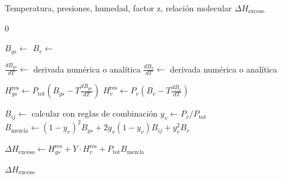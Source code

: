
\begin{algorithm}[H]
\caption{Cálculo de Entalpía en Exceso}
\label{alg:excess_enthalpy}
\begin{algorithmic}[1]
    \Require Temperatura, presiones, humedad, factor z, relación molecular
    \Ensure $\Delta H_{\text{exceso}}$
    
        \State \Return $0$
    \EndIf
    
    \State
    \State $B_{gs} \gets$ 
    \State $B_v \gets$ 
    
    \State
    \State $\frac{dB_{gs}}{dT} \gets$ derivada numérica o analítica
    \State $\frac{dB_v}{dT} \gets$ derivada numérica o analítica
    
    \State
    \State $H_{gs}^{\text{res}} \gets P_{\text{tot}}(B_{gs} - T \frac{dB_{gs}}{dT})$
    \State $H_v^{\text{res}} \gets P_v(B_v - T \frac{dB_v}{dT})$
    
    \State
    \State $B_{ij} \gets$ calcular con reglas de combinación
    \State $y_v \gets P_v/P_{\text{tot}}$
    \State $B_{\text{mezcla}} \gets (1-y_v)^2 B_{gs} + 2y_v(1-y_v)B_{ij} + y_v^2 B_v$
    
    \State
    \State $\Delta H_{\text{exceso}} \gets H_{gs}^{\text{res}} + Y \cdot H_v^{\text{res}} + P_{\text{tot}}B_{\text{mezcla}}$
    
    \State \Return $\Delta H_{\text{exceso}}$
\EndFunction
\end{algorithmic}
\end{algorithm}

